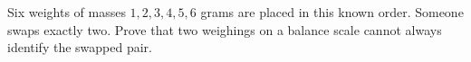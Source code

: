 Six weights of masses $1,2,3,4,5,6$ grams are placed in this known order. Someone swaps exactly two. Prove that two weighings on a balance scale cannot always identify the swapped pair.
